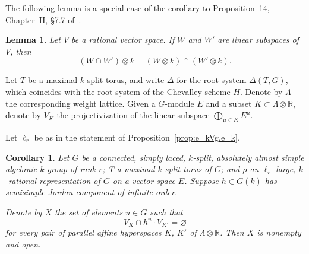 \documentclass{amsart}
\theoremstyle{plain}
\newtheorem{lemma}[theorem]{Lemma}
\newtheorem{corollary}[theorem]{Corollary}
\theoremstyle{definition}
\theoremstyle{remark}
\begin{document}
The following lemma is a special case of the corollary to Proposition~14, Chapter~II,
\S7.7 of~\cite{MR1727844}.
\begin{lemma}\label{lem:cor.toII.7.7.14}
Let $V$ be a rational vector space. If $W$ and $W'$ are linear subspaces of $V$, then $$(W
\cap W') \otimes k = (W
\otimes k) \cap(W'
\otimes k).$$
\end{lemma}

Let $T$ be a maximal $k$-split
torus, and write $\Delta$ for the root system $\Delta(T, G)$, which coincides with the
root system of the Chevalley scheme $H$. Denote by $\Lambda$ the
corresponding weight lattice. Given a $G$-module $E$ and a subset $K \subset \Lambda
\otimes \mathbb{R}$, denote by $V_{K}$ the projectivization of the linear subspace $\bigoplus_{\mu
\in K} E^{\mu}$.

Let $\ell_{r}$ be as in the statement of
Proposition~\ref{prop:e_kVg.e_k}.
\begin{corollary}\label{cor:localversionofproposition}
Let $G$ be a connected, simply laced, $k$-split, absolutely almost simple algebraic
$k$-group of rank $r$; T a maximal $k$-split torus of $G$; and
$\rho$ an $\ell_{r}$-large, $k$-rational
representation of $G$ on a vector space $E$. Suppose $h \in G(k)$ has
semisimple Jordan component of infinite order.

Denote by $X$ the set of elements $u \in G$ such that 
\begin{equation}\label{eq:VkVk-prime}
V_{K} \cap h^{u} \cdot V_{K'} = \varnothing
\end{equation}
for every pair of parallel affine hyperspaces $K$,
$K'$ of $\Lambda \otimes \mathbb{R}$.
Then $X$ is nonempty and open.
\end{corollary}
\end{document}
